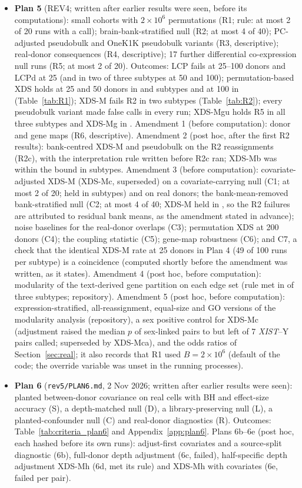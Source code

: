 \begin{itemize}
\item \textbf{Plan 5} (REV4; written after earlier results were seen, before its computations): small cohorts with $2\times10^6$ permutations (R1; rule: at most 2 of 20 runs with a call); brain-bank-stratified null (R2; at most 4 of 40); PC-adjusted pseudobulk and OneK1K pseudobulk variants (R3, descriptive); real-donor consequences (R4, descriptive); 17 further differential co-expression null runs (R5; at most 2 of 20). Outcomes: LCP fails at 25--100 donors and LCPd at 25 (and in two of three subtypes at 50 and 100); permutation-based XDS holds at 25 and 50 donors in \RfXDSpermTwentyFiveHolds{} and \RfXDSpermFiftyHolds{} subtypes and at 100 in \RfXDSpermHundredHolds{} (Table~\ref{tab:R1}); XDS-M fails R2 in two subtypes (Table~\ref{tab:R2}); every pseudobulk variant made false calls in every run; XDS-Mgu holds R5 in all three subtypes and XDS-Mg in \RfDCgHolds. Amendment 1 (before computation): donor and gene maps (R6, descriptive). Amendment 2 (post hoc, after the first R2 results): bank-centred XDS-M and pseudobulk on the R2 reassignments (R2c), with the interpretation rule written before R2c ran; XDS-Mb was within the bound in \RfBankXDSMbHolds{} subtypes. Amendment 3 (before computation): covariate-adjusted XDS-M (XDS-Mc, superseded) on a covariate-carrying null (C1; at most 2 of 20; held in \CoNullXcHolds{} subtypes) and on real donors; the bank-mean-removed bank-stratified null (C2; at most 4 of 40; XDS-M held in \BmXHolds, so the R2 failures are attributed to residual bank means, as the amendment stated in advance); noise baselines for the real-donor overlaps (C3); permutation XDS at 200 donors (C4); the coupling statistic (C5); gene-map robustness (C6); and C7, a check that the identical XDS-M rate at 25 donors in Plan 4 (49 of 100 runs per subtype) is a coincidence (computed shortly before the amendment was written, as it states). Amendment 4 (post hoc, before computation): modularity of the text-derived gene partition on each edge set (rule met in \McModNullHolds{} of three subtypes; repository). Amendment 5 (post hoc, before computation): expression-stratified, all-reassignment, equal-size and GO versions of the modularity analysis (repository), a sex positive control for XDS-Mc (adjustment raised the median $p$ of sex-linked pairs to \SexPc{} but left \SexXYc{} of 7 \emph{XIST}--Y pairs called; superseded by XDS-Mca), and the odds ratios of Section~\ref{sec:real}; it also records that R1 used $B=2\times10^6$ (default of the code; the override variable was unset in the running processes).
\item \textbf{Plan 6} (\texttt{rev5/PLAN6.md}, 2 Nov 2026; written after earlier results were seen): planted between-donor covariance on real cells with BH and effect-size accuracy (S), a depth-matched null (D), a library-preserving null (L), a planted-confounder null (C) and real-donor diagnostics (R). Outcomes: Table~\ref{tab:criteria_plan6} and Appendix~\ref{app:plan6}. Plans 6b--6e (post hoc, each hashed before its own runs): adjust-first covariates and a source-split diagnostic (6b), full-donor depth adjustment (6c, failed), half-specific depth adjustment XDS-Mh (6d, met its rule) and XDS-Mh with covariates (6e, failed per pair).

\end{itemize}
